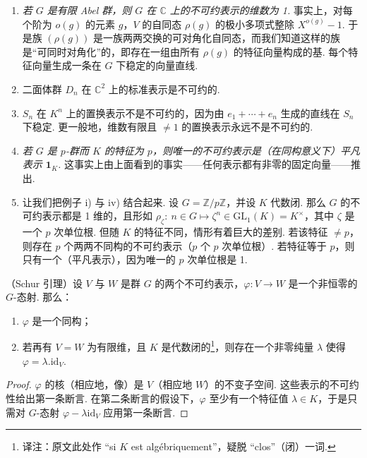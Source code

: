 \begin{numpara}[例]\label{np:fg-4-1-7}
\begin{enumerate}[label=\roman*)]
\item \emph{若 $G$ 是有限 Abel 群，则 $G$ 在 $\mathbb{C}$ 上的不可约表示的维数为 1.} 事实上，对每个阶为 $o(g)$ 的元素 $g$，$V$ 的自同态 $\rho(g)$ 的极小多项式整除 $X^{o(g)}-1$. 于是族 $(\rho(g))$ 是一族两两交换的可对角化自同态，而我们知道这样的族是``可同时对角化''的，即存在一组由所有 $\rho(g)$ 的特征向量构成的基. 每个特征向量生成一条在 $G$ 下稳定的向量直线.
\item 二面体群 $D_n$ 在 $\mathbb{C}^2$ 上的标准表示是不可约的.
\item $S_n$ 在 $K^n$ 上的置换表示不是不可约的，因为由 $e_1+\cdots+e_n$ 生成的直线在 $S_n$ 下稳定. 更一般地，维数有限且 $\neq 1$ 的置换表示永远不是不可约的.
\item \emph{若 $G$ 是 $p$-群而 $K$ 的特征为 $p$，则唯一的不可约表示是（在同构意义下）平凡表示 $\mathbf{1}_K$.} 这事实上由上面看到的事实——任何表示都有非零的固定向量——推出.
\item 让我们把例子 i) 与 iv) 结合起来. 设 $G=\mathbb{Z}/p\mathbb{Z}$，并设 $K$ 代数闭. 那么 $G$ 的不可约表示都是 1 维的，且形如 $\rho_\zeta:\ n\in G\mapsto\zeta^n\in\mathrm{GL}_1(K)=K^\times$，其中 $\zeta$ 是一个 $p$ 次单位根. 但随 $K$ 的特征不同，情形有着巨大的差别. 若该特征 $\neq p$，则存在 $p$ 个两两不同构的不可约表示（$p$ 个 $p$ 次单位根）. 若特征等于 $p$，则只有一个（平凡表示），因为唯一的 $p$ 次单位根是 1.
\end{enumerate}
\end{numpara}

\begin{proposition}\label{prop:fg-4-1-8}
（Schur 引理）设 $V$ 与 $W$ 是群 $G$ 的两个不可约表示，$\varphi:V\longrightarrow W$ 是一个非恒零的 $G$-态射. 那么：
\begin{enumerate}[label=\roman*)]
\item $\varphi$ 是一个同构；
\item 若再有 $V=W$ 为有限维，且 $K$ 是代数闭的\footnote{译注：原文此处作 ``si $K$ est algébriquement''，疑脱 ``clos''（闭）一词.}，则存在一个非零纯量 $\lambda$ 使得 $\varphi=\lambda.\mathrm{id}_V$.
\end{enumerate}
\end{proposition}

\begin{proof}
$\varphi$ 的核（相应地，像）是 $V$（相应地 $W$）的不变子空间. 这些表示的不可约性给出第一条断言. 在第二条断言的假设下，$\varphi$ 至少有一个特征值 $\lambda\in K$，于是只需对 $G$-态射 $\varphi-\lambda\mathrm{id}_V$ 应用第一条断言.
\end{proof}

